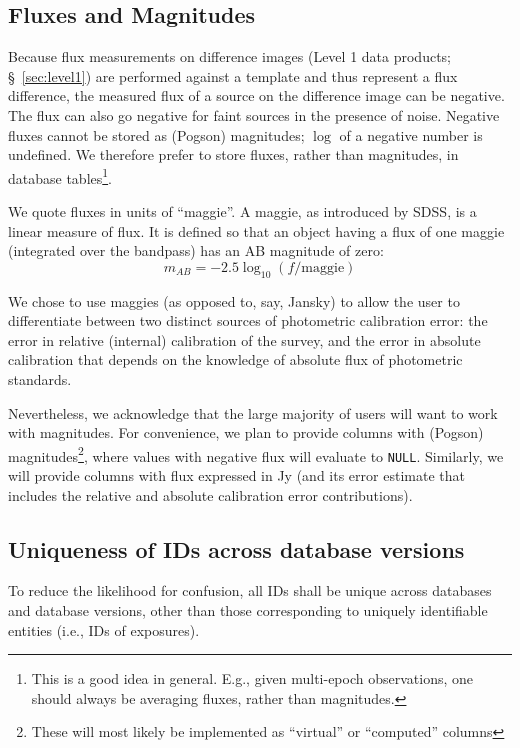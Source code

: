 \documentclass[12pt]{article}
\newcommand{\code}[1]{\texttt{#1}}
\newcommand{\req}[1]{\marginpar{\tiny #1}}
\newcommand{\dmreq}[1]{\req{DMS-REQ-#1}}
\begin{document}
\subsection{Fluxes and Magnitudes}
\label{sec:fluxes}
\dmreq{0043}
Because flux measurements on difference images (Level 1 data products; \S~\ref{sec:level1}) are performed against a template
and thus represent a flux difference, the measured flux of a source on the difference image can be negative. The flux can also go negative for faint sources in the presence of noise. Negative fluxes cannot be stored as (Pogson) magnitudes; $\log$ of a negative number is undefined. We therefore prefer to store fluxes, rather than magnitudes, in database tables\footnote{This is a good idea in general. E.g., given multi-epoch observations, one should always be averaging fluxes, rather than magnitudes.}.\dmreq{0347}

We quote fluxes in units of ``maggie''. A maggie, as introduced by SDSS, is a linear measure of flux. It is defined so that an object having a flux of one maggie (integrated over the bandpass) has an AB magnitude of zero:
\begin{equation}
    m_{AB} = -2.5 \log_{10}(f/\mathrm{maggie})
\end{equation}

We chose to use maggies (as opposed to, say, Jansky) to allow the user to differentiate between two distinct sources of photometric calibration error: the error in relative (internal) calibration of the survey, and the error in absolute calibration that depends on the knowledge of absolute flux of photometric standards.

\vspace{1em}
Nevertheless, we acknowledge that the large majority of users will want to work with magnitudes. For convenience, we plan to provide columns with (Pogson) magnitudes\footnote{These will most likely be implemented as ``virtual'' or ``computed'' columns}, where values with negative flux will evaluate to \code{NULL}. Similarly, we will provide columns with flux expressed in Jy (and its error estimate that includes the relative and absolute calibration error contributions).

\subsection{Uniqueness of IDs across database versions}

\dmreq{0292}
To reduce the likelihood for confusion, all IDs shall be unique across databases and database versions, other than those corresponding to uniquely identifiable entities (i.e., IDs of exposures).
\end{document}

